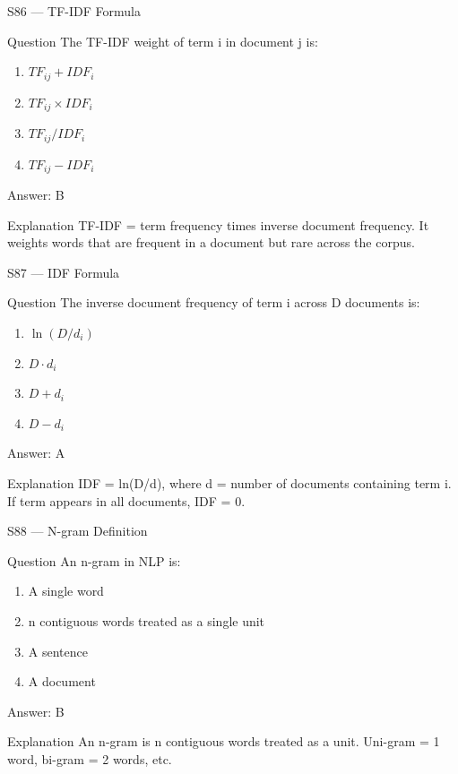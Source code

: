 \documentclass[aspectratio=169,8pt]{beamer}
\begin{document}
	\begin{frame}{S86 --- TF-IDF Formula}
		\begin{block}{Question}
			The TF-IDF weight of term i in document j is:
			\begin{enumerate}
				\item $TF_{ij} + IDF_i$
				\item $TF_{ij} \times IDF_i$
				\item $TF_{ij} / IDF_i$
				\item $TF_{ij} - IDF_i$
			\end{enumerate}
		\end{block}
		\begin{exampleblock}{Answer: B}\end{exampleblock}
		\begin{block}{Explanation}
			TF-IDF = term frequency times inverse document frequency. It weights words that are frequent in a document but rare across the corpus.
		\end{block}
	\end{frame}
	
	\begin{frame}{S87 --- IDF Formula}
		\begin{block}{Question}
			The inverse document frequency of term i across D documents is:
			\begin{enumerate}
				\item $\ln(D/d_i)$
				\item $D \cdot d_i$
				\item $D + d_i$
				\item $D - d_i$
			\end{enumerate}
		\end{block}
		\begin{exampleblock}{Answer: A}\end{exampleblock}
		\begin{block}{Explanation}
			IDF = ln(D/d), where d = number of documents containing term i. If term appears in all documents, IDF = 0.
		\end{block}
	\end{frame}
	
	\begin{frame}{S88 --- N-gram Definition}
		\begin{block}{Question}
			An n-gram in NLP is:
			\begin{enumerate}
				\item A single word
				\item n contiguous words treated as a single unit
				\item A sentence
				\item A document
			\end{enumerate}
		\end{block}
		\begin{exampleblock}{Answer: B}\end{exampleblock}
		\begin{block}{Explanation}
			An n-gram is n contiguous words treated as a unit. Uni-gram = 1 word, bi-gram = 2 words, etc.
		\end{block}
	\end{frame}
	
\end{document}

